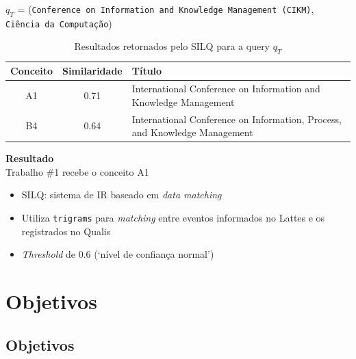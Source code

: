 \documentclass{beamer}
\begin{document}
\begin{frame}
  $q_T$ = (\texttt{Conference on Information and Knowledge Management (CIKM)}, \texttt{Ciência da Computação})

  \pause
  \footnotesize
  \begin{table}
    \begin{tabular}{ c | c | p{6.5cm} }
      \textbf{Conceito} & \textbf{Similaridade} & \textbf{Título}\\
      \hline \hline

      A1 & 0.71 & International Conference on Information and Knowledge Management\\ \hline
      B4 & 0.64 & International Conference on Information, Process, and Knowledge Management\\
    \end{tabular}
    \caption{Resultados retornados pelo SILQ para a query $q_T$}
  \end{table}

  \pause
  \normalsize
  \textbf{Resultado}\\
  Trabalho \#1 recebe o conceito A1
\end{frame}

\begin{frame}
  \begin{itemize}
    \item SILQ: sistema de IR baseado em \textit{data matching}
    \item Utiliza \texttt{trigrams} para \textit{matching} entre eventos informados no Lattes e os registrados no Qualis
    \item \textit{Threshold} de 0.6 (`nível de confiança normal')
  \end{itemize}
\end{frame}

\section{Objetivos}
\subsection*{Objetivos}
\end{document}
